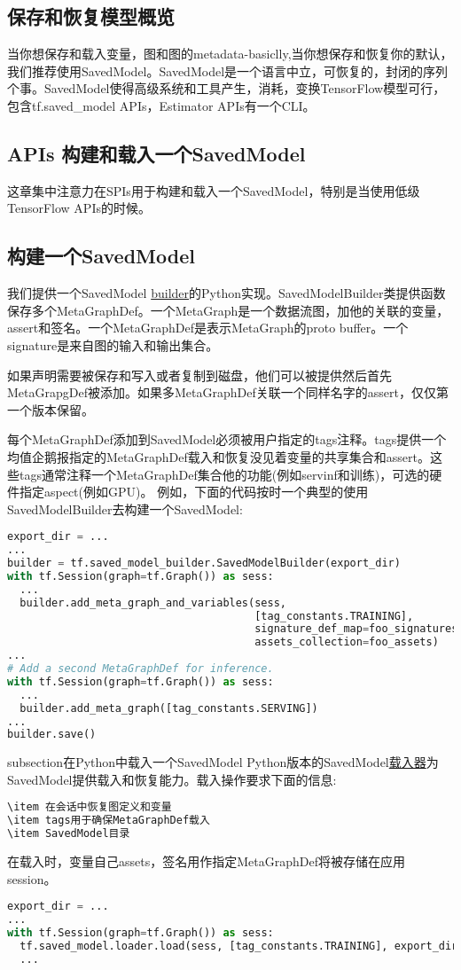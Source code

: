 \subsection{保存和恢复模型概览}
当你想保存和载入变量，图和图的metadata-basiclly,当你想保存和恢复你的默认，我们推荐使用SavedModel。SavedModel是一个语言中立，可恢复的，封闭的序列个事。SavedModel使得高级系统和工具产生，消耗，变换TensorFlow模型可行，包含tf.saved\_model APIs，Estimator APIs有一个CLI。
\subsection{APIs 构建和载入一个SavedModel}
这章集中注意力在SPIs用于构建和载入一个SavedModel，特别是当使用低级TensorFlow APIs的时候。
\subsection{构建一个SavedModel}
我们提供一个SavedModel \href{https://www.tensorflow.org/api_docs/python/tf/saved_model/builder?hl=zh-cn}{builder}的Python实现。SavedModelBuilder类提供函数保存多个MetaGraphDef。一个MetaGraph是一个数据流图，加他的关联的变量，assert和签名。一个MetaGraphDef是表示MetaGraph的proto buffer。一个signature是来自图的输入和输出集合。

如果声明需要被保存和写入或者复制到磁盘，他们可以被提供然后首先MetaGrapgDef被添加。如果多MetaGraphDef关联一个同样名字的assert，仅仅第一个版本保留。

每个MetaGraphDef添加到SavedModel必须被用户指定的tags注释。tags提供一个均值企鹅报指定的MetaGraphDef载入和恢复没见着变量的共享集合和assert。这些tags通常注释一个MetaGraphDef集合他的功能(例如servinf和训练)，可选的硬件指定aspect(例如GPU)。
例如，下面的代码按时一个典型的使用SavedModelBuilder去构建一个SavedModel:
\begin{lstlisting}[language=Python]
export_dir = ...
...
builder = tf.saved_model_builder.SavedModelBuilder(export_dir)
with tf.Session(graph=tf.Graph()) as sess:
  ...
  builder.add_meta_graph_and_variables(sess,
                                       [tag_constants.TRAINING],
                                       signature_def_map=foo_signatures,
                                       assets_collection=foo_assets)
...
# Add a second MetaGraphDef for inference.
with tf.Session(graph=tf.Graph()) as sess:
  ...
  builder.add_meta_graph([tag_constants.SERVING])
...
builder.save()
\end{lstlisting}
subsection{在Python中载入一个SavedModel}
Python版本的SavedModel\href{https://www.tensorflow.org/api_docs/python/tf/saved_model/loader?hl=zh-cn}{载入器}为SavedModel提供载入和恢复能力。载入操作要求下面的信息:
\begin{lstlisting}[language=Python]
\item 在会话中恢复图定义和变量
\item tags用于确保MetaGraphDef载入
\item SavedModel目录
\end{lstlisting}
在载入时，变量自己assets，签名用作指定MetaGraphDef将被存储在应用session。
\begin{lstlisting}[language=Python]
export_dir = ...
...
with tf.Session(graph=tf.Graph()) as sess:
  tf.saved_model.loader.load(sess, [tag_constants.TRAINING], export_dir)
  ...
\end{lstlisting}
